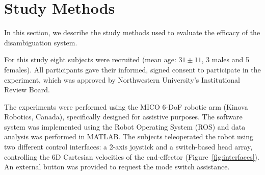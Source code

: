 \documentclass[journal]{IEEEtran}
\newcommand{\norm}[1]{\left\lVert#1\right\rVert}
\begin{document}

\section{Study Methods}\label{sec:study_methods}
In this section, we describe the study methods used to evaluate the efficacy of the disambiguation system. 

 For this study eight subjects were recruited (mean age: $31 \pm 11$, 3 males and 5 females). All participants gave their informed, signed consent to participate in the experiment, which was approved by Northwestern University's Institutional Review Board.

 The experiments were performed using the MICO 6-DoF robotic arm (Kinova Robotics, Canada), specifically designed for assistive purposes. The software system was implemented using the Robot Operating System (ROS) and data analysis was performed in MATLAB. 
The subjects teleoperated the robot using two different control interfaces: a 2-axis joystick and a switch-based head array, controlling the 6D Cartesian velocities of the end-effector (Figure~\ref{fig:interfaces}). An external button was provided to request the mode switch assistance. 
\end{document}

